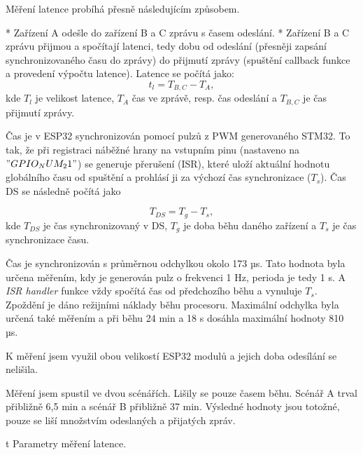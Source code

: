 Měření latence probíhá přesně následujícím způsobem.

\begitems
* Zařízení A odešle do zařízení B a C zprávu s časem odeslání.
* Zařízení B a C zprávu přijmou a spočítají latenci, tedy dobu od odeslání (přesněji zapsání synchronizovaného času do zprávy) do přijmutí zprávy (spuštění callback funkce a provedení výpočtu latence). Latence se počítá jako:
$$
t_l = T_{B,C} - T_A,
$$
kde $T_l$ je velikost latence, $T_A$ čas ve zprávě, resp. čas odeslání a $T_{B,C}$ je čas přijmutí zprávy.
\enditems

Čas je v ESP32 synchronizován pomocí pulzů z PWM generovaného STM32. To tak, že při registraci náběžné hrany na vstupním pinu (nastaveno na $"GPIO_NUM_21"$) se generuje přerušení (ISR), které uloží aktuální hodnotu globálního času od spuštění a prohlásí ji za výchozí čas synchronizace ($T_s$). Čas DS se následně počítá jako

$$
T_{DS} = T_g - T_s,
$$
kde $T_{DS}$ je čas synchronizovaný v DS, $T_g$ je doba běhu daného zařízení a $T_s$ je čas synchronizace času.

Čas je synchronizován s průměrnou odchylkou okolo 173 µs. Tato hodnota byla určena měřením, kdy je generován pulz o frekvenci 1 Hz, perioda je tedy 1 s. A {\em ISR handler} funkce vždy spočítá čas od předchozího běhu a vynuluje $T_s$. Zpoždění je dáno režijními náklady běhu procesoru. Maximální odchylka byla určená také měřením a při běhu 24 min a 18 s dosáhla maximální hodnoty 810 µs.

K měření jsem využil obou velikostí ESP32 modulů a jejich doba odesílání se nelišila.

Měření jsem spustil ve dvou scénářích. Lišily se pouze časem běhu. Scénář A trval přibližně 6,5 min a scénář B přibližně 37 min. Výsledné hodnoty jsou totožné, pouze se liší množstvím odeslaných a přijatých zpráv.

\midinsert {}
\caption/t Parametry měření latence.
\endinsert

